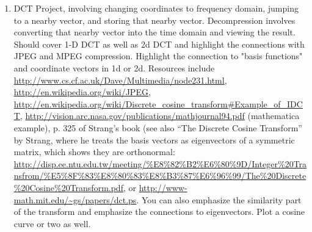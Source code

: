 \begin{enumerate}
\item DCT Project, involving changing coordinates to frequency domain,
  jumping to a nearby vector, and storing that nearby vector.
  Decompression involves converting that nearby vector into the time
  domain and viewing the result.  Should cover 1-D DCT as well as 2d
  DCT and highlight the connections with JPEG and MPEG compression.
  Highlight the connection to "basis functions" and coordinate vectors
  in 1d or 2d.  Resources include
  \url{http://www.cs.cf.ac.uk/Dave/Multimedia/node231.html},
  \url{http://en.wikipedia.org/wiki/JPEG},
  \url{http://en.wikipedia.org/wiki/Discrete_cosine_transform#Example_of_IDCT},
  \url{http://vision.arc.nasa.gov/publications/mathjournal94.pdf}
  (mathematica example), p. 325 of Strang's book (see also ``The
  Discrete Cosine Transform'' by Strang, where he treats the basis
  vectors as eigenvectors of a symmetric matrix, which shows they are
  orthonormal:  \url{http://disp.ee.ntu.edu.tw/meeting/%E8%82%B2%E6%80%9D/Integer%20Transfrom/%E5%8F%83%E8%80%83%E8%B3%87%E6%96%99/The%20Discrete%20Cosine%20Transform.pdf}, or
  \url{http://www-math.mit.edu/~gs/papers/dct.ps}.  You can also
  emphasize the similarity part of the transform and emphasize the
  connections to eigenvectors.  Plot a cosine curve or two as well.
\end{enumerate}


